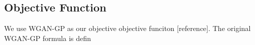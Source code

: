 \subsection{Objective Function}
We use WGAN-GP as our objective objective funciton [reference]. The original WGAN-GP formula is defin